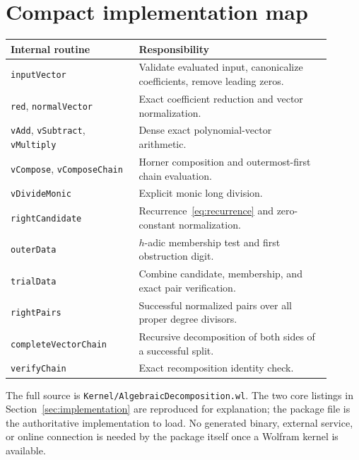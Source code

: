 \documentclass[11pt,letterpaper]{article}
\theoremstyle{definition}
\theoremstyle{remark}
\newcommand{\wt}[1]{\texttt{#1}}
\begin{document}
\section{Compact implementation map}
\label{app:map}
\begin{center}
\begin{tabular}{>{\raggedright\arraybackslash}p{0.36\linewidth}>{\raggedright\arraybackslash}p{0.54\linewidth}}
\toprule
\textbf{Internal routine} & \textbf{Responsibility}\\
\midrule
\wt{inputVector} & Validate evaluated input, canonicalize coefficients, remove leading zeros.\\
\wt{red}, \wt{normalVector} & Exact coefficient reduction and vector normalization.\\
\wt{vAdd}, \wt{vSubtract}, \wt{vMultiply} & Dense exact polynomial-vector arithmetic.\\
\wt{vCompose}, \wt{vComposeChain} & Horner composition and outermost-first chain evaluation.\\
\wt{vDivideMonic} & Explicit monic long division.\\
\wt{rightCandidate} & Recurrence~\eqref{eq:recurrence} and zero-constant normalization.\\
\wt{outerData} & $h$-adic membership test and first obstruction digit.\\
\wt{trialData} & Combine candidate, membership, and exact pair verification.\\
\wt{rightPairs} & Successful normalized pairs over all proper degree divisors.\\
\wt{completeVectorChain} & Recursive decomposition of both sides of a successful split.\\
\wt{verifyChain} & Exact recomposition identity check.\\
\bottomrule
\end{tabular}
\end{center}

The full source is \wt{Kernel/AlgebraicDecomposition.wl}. The two core
listings in Section~\ref{sec:implementation} are reproduced for explanation;
the package file is the authoritative implementation to load. No generated
binary, external service, or online connection is needed by the package
itself once a Wolfram kernel is available.
\end{document}
